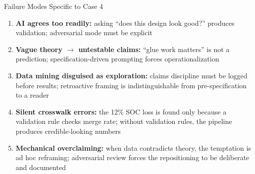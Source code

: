 \documentclass[10pt,english,aspectratio=169]{beamer}
\begin{document}
\begin{frame}{Failure Modes Specific to Case 4}
\begin{enumerate}
  \item \textbf{AI agrees too readily:} asking ``does this design look good?'' produces validation; adversarial mode must be explicit
  \item \textbf{Vague theory $\to$ untestable claims:} ``glue work matters'' is not a prediction; specification-driven prompting forces operationalization
  \item \textbf{Data mining disguised as exploration:} claims discipline must be logged before results; retroactive framing is indistinguishable from pre-specification to a reader
  \item \textbf{Silent crosswalk errors:} the 12\% SOC loss is found only because a validation rule checks merge rate; without validation rules, the pipeline produces credible-looking numbers
  \item \textbf{Mechanical overclaiming:} when data contradicts theory, the temptation is ad hoc reframing; adversarial review forces the repositioning to be deliberate and documented
\end{enumerate}
\end{frame}
\end{document}

